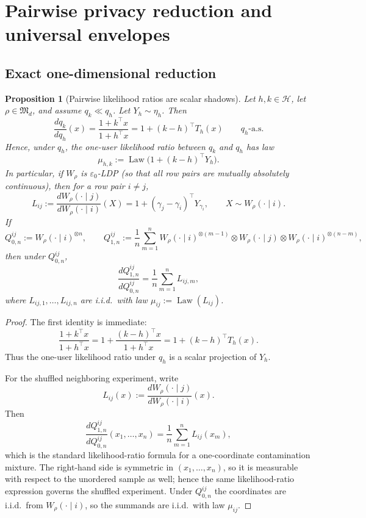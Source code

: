 \documentclass[11pt]{amsart}
\newtheorem{proposition}[proposition]{Proposition}
\theoremstyle{definition}
\DeclareMathOperator{\Law}{Law}
\newcommand{\cH}{\mathcal H}
\newcommand{\fM}{\mathfrak M}
\begin{document}
\section{Pairwise privacy reduction and universal envelopes}\label{sec:privacy}

\subsection{Exact one-dimensional reduction}

\begin{proposition}[Pairwise likelihood ratios are scalar shadows]\label{prop:pairwise-lr}
Let $h,k\in\cH$, let $\rho\in\fM_d$, and assume $q_k\ll q_h$. Let $Y_h\sim\eta_h$. Then
\[
\frac{dq_k}{dq_h}(x)=\frac{1+k^\top x}{1+h^\top x}=1+(k-h)^\top T_h(x)
\qquad q_h\text{-a.s.}
\]
Hence, under $q_h$, the one-user likelihood ratio between $q_k$ and $q_h$ has law
\[
\mu_{h,k}:=\Law\bigl(1+(k-h)^\top Y_h\bigr).
\]
In particular, if $W_\rho$ is $\varepsilon_0$-LDP (so that all row pairs are mutually absolutely continuous), then for a row pair $i\neq j$,
\[
L_{ij}:=\frac{dW_\rho(\cdot\mid j)}{dW_\rho(\cdot\mid i)}(X)=1+(\gamma_j-\gamma_i)^\top Y_{\gamma_i},\qquad X\sim W_\rho(\cdot\mid i).
\]
If
\[
Q_{0,n}^{ij}:=W_\rho(\cdot\mid i)^{\otimes n},
\qquad
Q_{1,n}^{ij}:=\frac1n\sum_{m=1}^n W_\rho(\cdot\mid i)^{\otimes(m-1)}\otimes W_\rho(\cdot\mid j)\otimes W_\rho(\cdot\mid i)^{\otimes(n-m)},
\]
then under $Q_{0,n}^{ij}$,
\[
\frac{dQ_{1,n}^{ij}}{dQ_{0,n}^{ij}}=\frac1n\sum_{m=1}^n L_{ij,m},
\]
where $L_{ij,1},\dots,L_{ij,n}$ are i.i.d.\ with law $\mu_{ij}:=\Law(L_{ij})$.
\end{proposition}

\begin{proof}
The first identity is immediate:
\[
\frac{1+k^\top x}{1+h^\top x}=1+\frac{(k-h)^\top x}{1+h^\top x}=1+(k-h)^\top T_h(x).
\]
Thus the one-user likelihood ratio under $q_h$ is a scalar projection of $Y_h$.

For the shuffled neighboring experiment, write
\[
L_{ij}(x):=\frac{dW_\rho(\cdot\mid j)}{dW_\rho(\cdot\mid i)}(x).
\]
Then
\[
\frac{dQ_{1,n}^{ij}}{dQ_{0,n}^{ij}}(x_1,\dots,x_n)
=\frac1n\sum_{m=1}^n L_{ij}(x_m),
\]
which is the standard likelihood-ratio formula for a one-coordinate contamination mixture. The right-hand side is symmetric in $(x_1,\dots,x_n)$, so it is measurable with respect to the unordered sample as well; hence the same likelihood-ratio expression governs the shuffled experiment. Under $Q_{0,n}^{ij}$ the coordinates are i.i.d.\ from $W_\rho(\cdot\mid i)$, so the summands are i.i.d.\ with law $\mu_{ij}$.
\end{proof}
\end{document}
